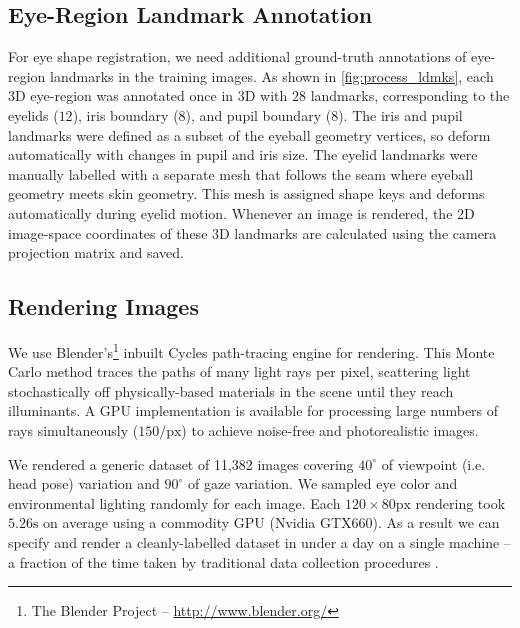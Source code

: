 \subsection{Eye-Region Landmark Annotation}

For eye shape registration, we need additional ground-truth annotations of eye-region landmarks in the training images.
As shown in \autoref{fig:process_ldmks}, each 3D eye-region was annotated once in 3D with $28$ landmarks, corresponding to the eyelids ($12$), iris boundary ($8$), and pupil boundary ($8$).
The iris and pupil landmarks were defined as a subset of the eyeball geometry vertices, so deform automatically with changes in pupil and iris size.
The eyelid landmarks were manually labelled with a separate mesh that follows the seam where eyeball geometry meets skin geometry.
This mesh is assigned shape keys and deforms automatically during eyelid motion.
%
Whenever an image is rendered, the 2D image-space coordinates of these 3D landmarks are calculated using the camera projection matrix and saved.

\subsection{Rendering Images}

We use Blender's\footnote{The Blender Project -- \url{http://www.blender.org/}} inbuilt Cycles path-tracing engine for rendering.
This Monte Carlo method traces the paths of many light rays per pixel, scattering light stochastically off physically-based materials in the scene until they reach illuminants.
A GPU implementation is available for processing large numbers of rays simultaneously ($150/\textrm{px}$) to achieve noise-free and photorealistic images.

We rendered a generic \dataset dataset of 11,382 images covering $40^{\circ}$ of viewpoint (i.e. head pose) variation and $90^{\circ}$ of gaze variation.
We sampled eye color and environmental lighting randomly for each image.
Each $120\!\times\!80\textrm{px}$ rendering took $5.26\textrm{s}$ on average using a commodity GPU (Nvidia GTX660).
As a result we can specify and render a cleanly-labelled dataset in under a day on a single machine -- a fraction of the time taken by traditional data collection procedures \cite{zhang15_cvpr}.